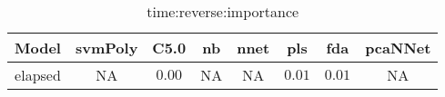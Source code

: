 \begin{table}[!ht]
	\centering
	\begin{tabular}{|c|c|c|c|c|c|c|c|}
		\hline
		Model & svmPoly & C5.0 & nb & nnet & pls & fda & pcaNNet \\ \hline
		elapsed & NA & $0.00$ & NA & NA & $0.01$ & $0.01$ & NA \\ \hline
	\end{tabular}
	\caption{time:reverse:importance}
	\label{tab:time:reverse:importance}
\end{table}
